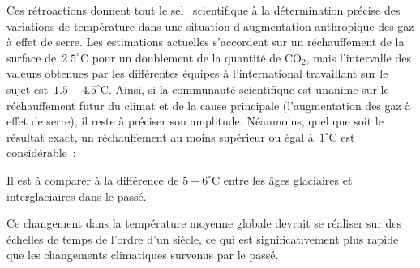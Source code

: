 \sk
Ces rétroactions donnent tout le \og sel \fg~scientifique à la détermination précise des variations de température dans une situation d'augmentation anthropique des gaz à effet de serre. Les estimations actuelles s'accordent sur un réchauffement de la surface de~$2.5^{\circ}$C pour un doublement de la quantité de CO$_2$, mais l'intervalle des valeurs obtenues par les différentes équipes à l'international travaillant sur le sujet est~$1.5-4.5^{\circ}$C. Ainsi, si la communauté scientifique est unanime sur le réchauffement futur du climat et de la cause principale (l'augmentation des gaz à effet de serre), il reste à préciser son amplitude. Néanmoins, quel que soit le résultat exact, un réchauffement au moins supérieur ou égal à~$1^{\circ}$C est considérable~:
\begin{citemize}
\item Il est à comparer à la différence de $5-6^{\circ}$C entre les âges glaciaires et interglaciaires dans le passé.
\item Ce changement dans la température moyenne globale devrait se réaliser sur des échelles de temps de l'ordre d'un siècle, ce qui est significativement plus rapide que les changements climatiques survenus par le passé.
\end{citemize}


